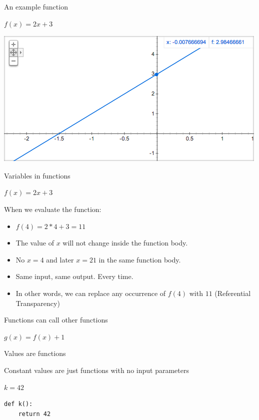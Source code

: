 \documentclass{beamer}
\begin{document}
\begin{frame}{An example function}

  {\Huge $f(x) = 2x + 3$}

  \includegraphics[scale=0.5]{img/fx2x3.png}

\end{frame}

\begin{frame}{Variables in functions}

  {\Huge $f(x) = 2x + 3$}

  \vskip5mm

When we evaluate the function:
  \begin{itemize}[<+->]
    \item $f(4) = 2*4 + 3 = 11$
    \item The value of $x$ will not change inside the function body.
    \item No $x = 4$ and later $x = 21$ in the same function body.
    \item Same input, same output. Every time.
    \item In other words, we can replace any occurrence of $f(4)$ with
      $11$ (Referential Transparency)
  \end{itemize}
\end{frame}


\begin{frame}{Functions can call other functions}

  {\Huge $g(x) = f(x) + 1$}

\end{frame}

\begin{frame}[fragile]{Values are functions}

  {\large Constant values are just functions with no input parameters}

  \vskip5mm

  {\Huge $k = 42$}

  \begin{verbatim}
def k():
    return 42
  \end{verbatim}

\end{frame}
\end{document}
